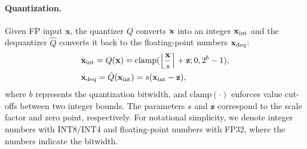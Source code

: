 \paragraph{Quantization.} Given FP input \(\mathbf{x}\), the quantizer $Q$ converts ${\mathbf{x}}$ into an integer ${\mathbf{x}}_\text{int}$ and the dequantizer $\hat Q$ converts it back to the floating-point numbers ${\mathbf{x}}_\text{deq}$:
\begin{align}
    & {\mathbf{x}}_{\text{int}} = Q({\mathbf{x}}) = \text{clamp}(\left\lfloor\frac{{\mathbf{x}}}{s}\right\rceil + {\mathbf{z}}; 0, 2^b-1), \\
    & {\mathbf{x}}_\text{deq} = \hat Q({\mathbf{x}}_{\text{int}}) = s({\mathbf{x}}_{\text{int}}-{\mathbf{z}}),
\end{align}
where \(b\) represents the quantization bitwidth, and \(\text{clamp}(\cdot)\) enforces value cut-offs between two integer bounds. The parameters \(s\) and \(\mathbf{z}\) correspond to the scale factor and zero point, respectively. For notational simplicity, we denote integer numbers with INT8/INT4 and floating-point numbers with FP32, where the numbers indicate the bitwidth.



